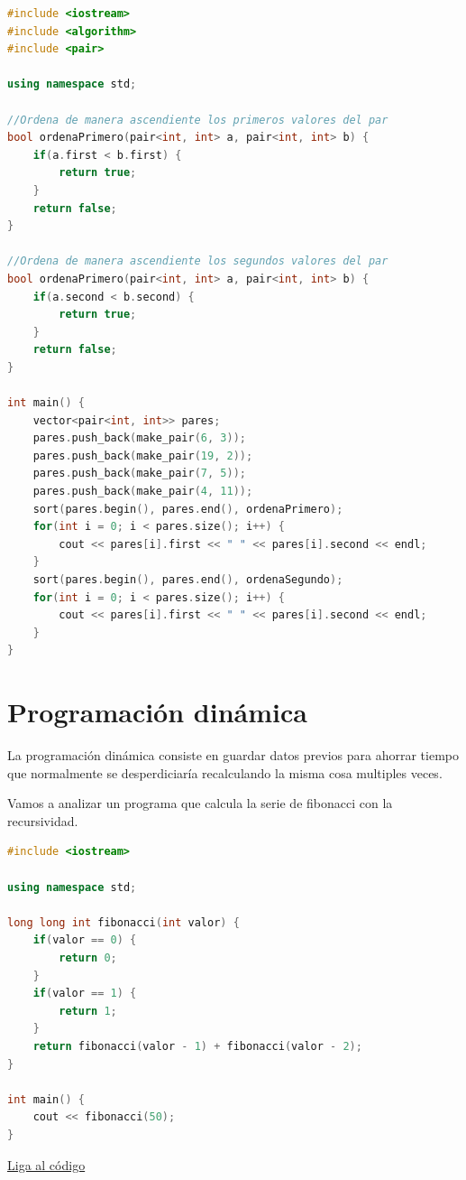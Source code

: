 \documentclass{article}
\begin{document}
\begin{lstlisting}[language=C++, caption=Ordenamiento estandar sobrecargada]
#include <iostream>
#include <algorithm>
#include <pair>

using namespace std;

//Ordena de manera ascendiente los primeros valores del par
bool ordenaPrimero(pair<int, int> a, pair<int, int> b) {
    if(a.first < b.first) {
        return true;
    }
    return false;
}

//Ordena de manera ascendiente los segundos valores del par
bool ordenaPrimero(pair<int, int> a, pair<int, int> b) {
    if(a.second < b.second) {
        return true;
    }
    return false;
}

int main() {
    vector<pair<int, int>> pares;
    pares.push_back(make_pair(6, 3));
    pares.push_back(make_pair(19, 2));
    pares.push_back(make_pair(7, 5));
    pares.push_back(make_pair(4, 11));
    sort(pares.begin(), pares.end(), ordenaPrimero);
    for(int i = 0; i < pares.size(); i++) {
        cout << pares[i].first << " " << pares[i].second << endl;
    }
    sort(pares.begin(), pares.end(), ordenaSegundo);
    for(int i = 0; i < pares.size(); i++) {
        cout << pares[i].first << " " << pares[i].second << endl;
    }
}
\end{lstlisting}

\section{Programación dinámica}

La programación dinámica consiste en guardar datos previos para ahorrar tiempo que normalmente se desperdiciaría recalculando la misma cosa multiples veces.

Vamos a analizar un programa que calcula la serie de fibonacci con la recursividad.

\begin{lstlisting}[language=C++, caption=Fibonacci]
#include <iostream>

using namespace std;

long long int fibonacci(int valor) {
    if(valor == 0) {
        return 0;
    }
    if(valor == 1) {
        return 1;
    }
    return fibonacci(valor - 1) + fibonacci(valor - 2);
}

int main() {
    cout << fibonacci(50);
}
\end{lstlisting}
\href{https://repl.it/@Jamesscn/Fibonacci}{Liga al código} \\
\end{document}
